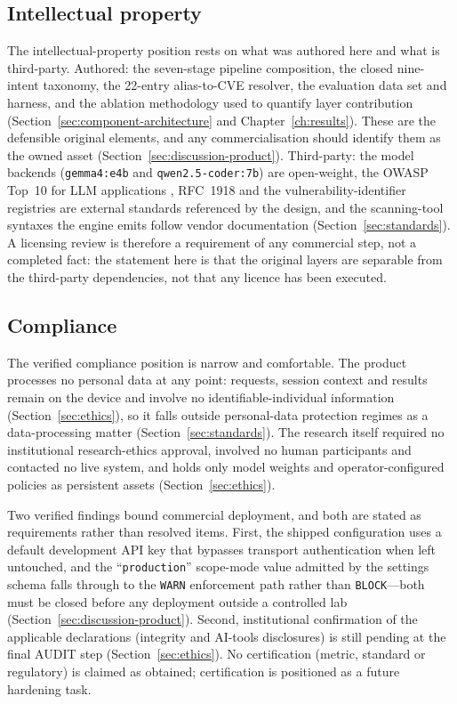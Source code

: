 \subsection*{Intellectual property}

The intellectual-property position rests on what was authored here and what is
third-party. Authored: the seven-stage pipeline composition, the closed
nine-intent taxonomy, the 22-entry alias-to-CVE resolver, the evaluation data
set and harness, and the ablation methodology used to quantify layer
contribution (Section~\ref{sec:component-architecture} and
Chapter~\ref{ch:results}). These are the defensible original elements, and any
commercialisation should identify them as the owned asset
(Section~\ref{sec:discussion-product}). Third-party: the model backends
(\texttt{gemma4:e4b} and \texttt{qwen2.5-coder:7b}) are open-weight, the OWASP
Top~10 for LLM applications \parencite{owasp2025}, RFC~1918 \parencite{rfc1918}
and the vulnerability-identifier registries \parencite{nistnvd} are external
standards referenced by the design, and the scanning-tool syntaxes the engine
emits follow vendor documentation \parencite{lyon2009nmap,metasploit}
(Section~\ref{sec:standards}). A licensing review is therefore a requirement of
any commercial step, not a completed fact: the statement here is that the
original layers are separable from the third-party dependencies, not that any
licence has been executed.

\subsection*{Compliance}

The verified compliance position is narrow and comfortable. The product
processes no personal data at any point: requests, session context and results
remain on the device and involve no identifiable-individual information
(Section~\ref{sec:ethics}), so it falls outside personal-data protection regimes
as a data-processing matter (Section~\ref{sec:standards}). The research itself
required no institutional research-ethics approval, involved no human
participants and contacted no live system, and holds only model weights and
operator-configured policies as persistent assets
(Section~\ref{sec:ethics}).

Two verified findings bound commercial deployment, and both are stated as
requirements rather than resolved items. First, the shipped configuration uses a
default development API key that bypasses transport authentication when left
untouched, and the ``\texttt{production}'' scope-mode value admitted by the
settings schema falls through to the \texttt{WARN} enforcement path rather than
\texttt{BLOCK}---both must be closed before any deployment outside a controlled
lab (Section~\ref{sec:discussion-product}). Second, institutional confirmation
of the applicable declarations (integrity and AI-tools disclosures) is still
pending at the final AUDIT step (Section~\ref{sec:ethics}). No certification
(metric, standard or regulatory) is claimed as obtained; certification is
positioned as a future hardening task.

